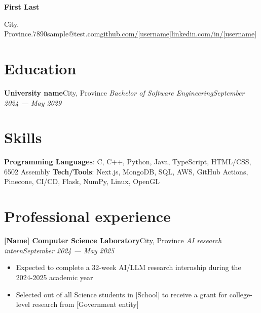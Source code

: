 \documentclass{article}
\newcommand{\cdelim}{\;\textbar\;}
\newcommand{\newrole}[4]{
    {\normalfont\textbf{#1}\hfill#3}
    \newline
    \textit{#2}\hfill\textit{#4}
}
\newenvironment{bulletpoints}{\begin{itemize}\setlength\itemsep{-0.3em}}{\end{itemize}}
\begin{document}
\begin{center}
    {\Huge\bfseries First Last}\\\vspace*{2pt}

    City, Province\cdelim 123.456.7890\cdelim sample@test.com\cdelim\href{https://github.com/[username]}{github.com/[username]}\cdelim\href{https://linkedin.com/in/[username]}{linkedin.com/in/[username]}\\
\end{center}

\section*{Education}

\newrole{University name}{Bachelor of Software Engineering}{City, Province}{September 2024 --- May 2029}


\section*{Skills}

{\bfseries Programming Languages}: C, C++, Python, Java, TypeScript, HTML/CSS, 6502 Assembly
\newline
{\bfseries Tech/Tools}: Next.js, MongoDB, SQL, AWS, GitHub Actions, Pinecone, CI/CD, Flask, NumPy, Linux, OpenGL


\section*{Professional experience}

\newrole{[Name] Computer Science Laboratory}{AI research intern}{City, Province}{September 2024 --- May 2025}
\begin{bulletpoints}
    \item Expected to complete a 32-week AI/LLM research internship during the 2024-2025 academic year
    \item Selected out of all Science students in [School] to receive a grant for college-level research from [Government entity]
\end{bulletpoints}
\end{document}
